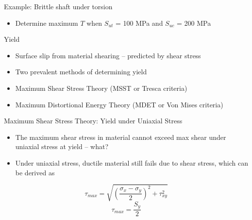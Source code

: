 \documentclass[10pt, svgnames]{beamer}
\begin{document}
\begin{frame}[label={sec:org7bfa2ad}]{Example: Brittle shaft under torsion}

\begin{itemize}
\item Determine maximum \(T\) when \(S_{ut}\) = 100 MPa and \(S_{uc}\) = 200 MPa
\end{itemize}
\end{frame}


\begin{frame}[label={sec:org589a043}]{Yield}
\begin{itemize}
\item Surface slip from material shearing -- predicted by shear stress
\item Two prevalent methods of determining yield
\item Maximum Shear Stress Theory (MSST or Tresca criteria)
\item Maximum Distortional Energy Theory (MDET or Von Mises criteria)
\end{itemize}
\end{frame}

\begin{frame}[label={sec:orgc59499a}]{Maximum Shear Stress Theory: Yield under Uniaxial Stress}
\begin{itemize}
\item The maximum shear stress in material cannot exceed max shear under uniaxial stress at yield -- what?
\item Under uniaxial stress, ductile material still fails due to shear stress, which can be derived as
\end{itemize}

$$\tau_{max} = \sqrt{\left(\frac{\sigma_x-\sigma_y}{2}\right)^2+\tau_{xy}^2}$$
$$\tau_{max} = \frac{S_y}{2}$$
\end{frame}
\end{document}
